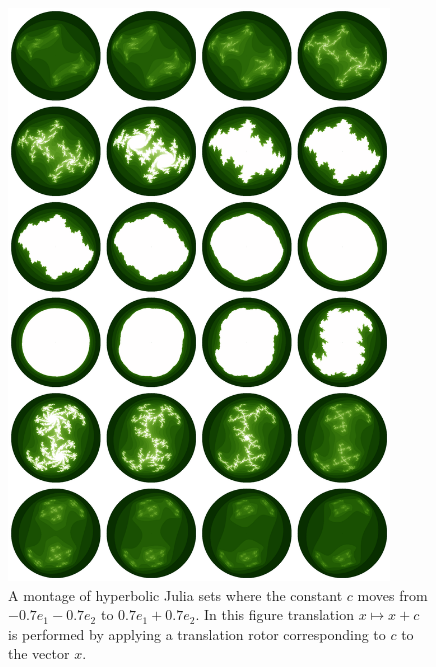 \begin{figure}[p]
\centering
\includegraphics[width=0.9\textwidth]{julia_montage}
\caption{\label{fig:julia_montage} 
  A montage of hyperbolic Julia sets where the constant $c$ moves from $-0.7e_1 - 0.7e_2$
  to $0.7e_1 + 0.7e_2$. 
  In this figure translation $x \mapsto x + c$ is performed by applying a
  translation rotor corresponding to $c$ to the vector $x$.
}
\end{figure}

